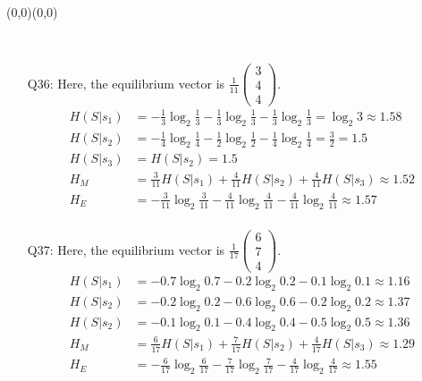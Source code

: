 \documentclass[11pt]{article}
\newcommand{\vc}[1]{\begin{pmatrix}#1\end{pmatrix}}
\newcommand{\moveup}{\begin{picture}(0,0)(0,0)\end{picture}\vspace*{-8.15mm}}
\begin{document}
\bigskip{}\moveup\\[-2mm]
\begin{itemize}
  \item[{Q36:}] Here, the equilibrium vector is $\frac{1}{11}\vc{3\\4\\4}$.
    \begin{align*}
      H(S|s_1) &= - \frac{1}{ 3}\log_2 \frac{1}{ 3} - \frac{1}{ 3}\log_2 \frac{1}{ 3} - \frac{1}{ 3}\log_2 \frac{1}{ 3} = \log_2 3 \approx 1.58\\
      H(S|s_2) &= - \frac{1}{ 4}\log_2 \frac{1}{ 4} - \frac{1}{ 2}\log_2 \frac{1}{ 2} - \frac{1}{ 4}\log_2 \frac{1}{ 4} = \frac{3}{2} = 1.5\\
      H(S|s_3) &= H(S|s_2) = 1.5\\
      H_M     &=   \frac{3}{11}H(S|s_1) + \frac{4}{11}H(S|s_2) + \frac{4}{11}H(S|s_3) \approx 1.52\\
      H_E      &= - \frac{3}{11}\log_2 \frac{3}{11} - \frac{4}{11}\log_2 \frac{4}{11} - \frac{4}{11}\log_2 \frac{4}{11} \approx 1.57\\
    \end{align*}
  \item[{Q37:}] Here, the equilibrium vector is $\frac{1}{17}\vc{6\\7\\4}$.
    \begin{align*}
      H(S|s_1) &= - 0.7\log_2 0.7 - 0.2\log_2 0.2 - 0.1\log_2 0.1 \approx 1.16\\
      H(S|s_2) &= - 0.2\log_2 0.2 - 0.6\log_2 0.6 - 0.2\log_2 0.2 \approx 1.37\\
      H(S|s_2) &= - 0.1\log_2 0.1 - 0.4\log_2 0.4 - 0.5\log_2 0.5 \approx 1.36\\
      H_M     &=   \frac{6}{17}H(S|s_1) + \frac{7}{17}H(S|s_2) + \frac{4}{17}H(S|s_3) \approx 1.29\\
      H_E      &= - \frac{6}{17}\log_2 \frac{6}{17} - \frac{7}{17}\log_2 \frac{7}{17} - \frac{4}{17}\log_2 \frac{4}{17} \approx 1.55\\
    \end{align*}
\end{itemize}
\end{document}
